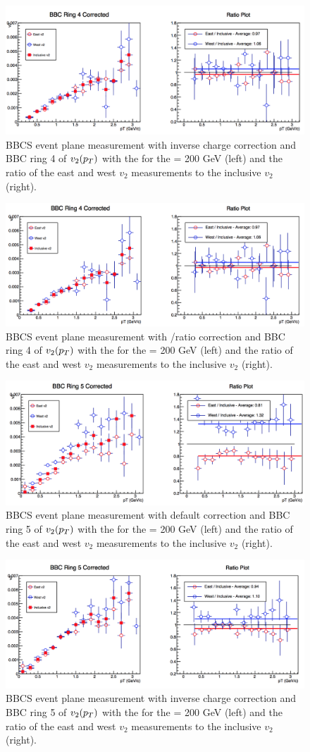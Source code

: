 \begin{figure}
\centering
\includegraphics[width=0.65\linewidth]{figs/bbc_4_data.png}
\caption{BBCS event plane measurement with inverse charge correction and BBC ring 4 of $v_{2}(\mbox{$p_T$})$ with the  for the \pau \sqsn = 200 GeV (left) and the ratio of the east and west $v_2$ measurements to the inclusive $v_2$ (right).}
\end{figure}

\begin{figure}
\centering
\includegraphics[width=0.65\linewidth]{figs/bbc_4_pp.png}
\caption{BBCS event plane measurement with \pp/\pau ratio correction and BBC ring 4 of $v_{2}(\mbox{$p_T$})$ with the  for the \pau \sqsn = 200 GeV (left) and the ratio of the east and west $v_2$ measurements to the inclusive $v_2$ (right).}
\end{figure}

\begin{figure}
\centering
\includegraphics[width=0.65\linewidth]{figs/bbc_5_default.png}
\caption{BBCS event plane measurement with default correction and BBC ring 5 of $v_{2}(\mbox{$p_T$})$ with the  for the \pau \sqsn = 200 GeV (left) and the ratio of the east and west $v_2$ measurements to the inclusive $v_2$ (right).}
\end{figure}

\begin{figure}
\centering
\includegraphics[width=0.65\linewidth]{figs/bbc_5_data.png}
\caption{BBCS event plane measurement with inverse charge correction and BBC ring 5 of $v_{2}(\mbox{$p_T$})$ with the  for the \pau \sqsn = 200 GeV (left) and the ratio of the east and west $v_2$ measurements to the inclusive $v_2$ (right).}
\end{figure}

